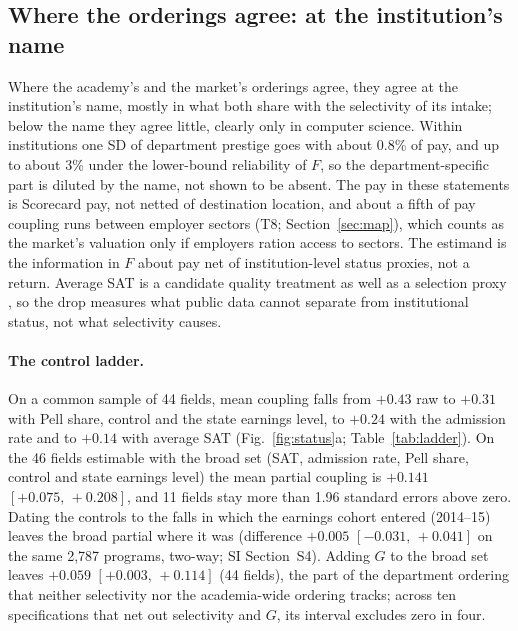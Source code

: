 \documentclass[11pt]{article}
\newcommand{\SI}[1]{SI Section~S#1}
\newcommand{\ci}[2]{$[#1,\allowbreak\,#2]$}
\begin{document}
\subsection{Where the orderings agree: at the institution's name}\label{sec:status}

Where the academy's and the market's orderings agree, they agree at the institution's name, mostly in what both
share with the selectivity of its intake; below the name they agree little, clearly only in computer science.
Within institutions one SD of department prestige goes with about 0.8\% of pay, and up to about 3\% under the
lower-bound reliability of $F$, so the department-specific part is diluted by the name, not shown to be absent.
The pay in these statements is Scorecard pay, not netted of destination location, and about a fifth of pay
coupling runs between employer sectors (T8; Section~\ref{sec:map}), which counts as the market's valuation only if
employers ration access to sectors.
The estimand is the information in $F$ about pay net of institution-level status proxies, not a return. Average
SAT is a candidate quality treatment as well as a selection proxy \citep{dale2002estimating}, so the drop measures
what public data cannot separate from institutional status, not what selectivity causes.

\paragraph{The control ladder.} On a common sample of 44 fields, mean coupling falls from $+0.43$ raw to $+0.31$
with Pell share, control and the state earnings level, to $+0.24$ with the admission rate and to $+0.14$ with
average SAT (Fig.~\ref{fig:status}a; Table~\ref{tab:ladder}). On the 46 fields estimable with the broad set (SAT,
admission rate, Pell share, control and state earnings level) the mean partial coupling is $+0.141$
\ci{+0.075}{+0.208}, and 11 fields stay more than 1.96 standard errors above zero. Dating the controls to the falls
in which the earnings cohort entered (2014--15) leaves the broad partial where it was (difference $+0.005$
\ci{-0.031}{+0.041} on the same 2,787 programs, two-way; \SI{4}). Adding $G$ to the broad set leaves $+0.059$
\ci{+0.003}{+0.114} (44 fields), the part of the department ordering that neither selectivity nor the academia-wide
ordering tracks; across ten specifications that net out selectivity and $G$, its interval excludes zero in four.
\end{document}
